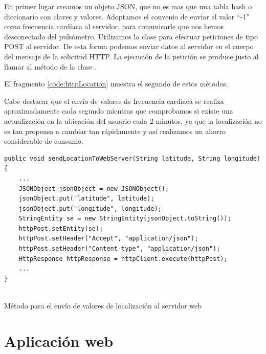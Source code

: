En primer lugar creamos un objeto \ac{JSON}, que no es mas que una tabla hash o diccionario con claves y valores. Adoptamos el convenio de enviar el valor ``-1'' como frecuencia cardíaca al servidor, para comunicarle que nos hemos desconectado del pulsómetro. Utilizamos la clase  para efectuar peticiones de tipo POST al servidor. De esta forma podemos enviar datos al servidor en el cuerpo del mensaje de la solicitud HTTP. La ejecución de la petición se produce justo al llamar al método  de la clase .

El fragmento \ref{code:httpLocation} muestra el segundo de estos métodos.

Cabe destacar que el envío de valores de frecuencia cardíaca se realiza aproximadamente cada segundo mientras que comprobamos si existe una actualización en la ubicación del usuario cada 2 minutos, ya que la localización no es tan propensa a cambiar tan rápidamente y así realizamos un ahorro considerable de consumo.

\begin{listing}[h] 
\begin{verbatim}
public void sendLocationToWebServer(String latitude, String longitude) {
	...
    JSONObject jsonObject = new JSONObject();
    jsonObject.put("latitude", latitude);
    jsonObject.put("longitude", longitude);
    StringEntity se = new StringEntity(jsonObject.toString());
    httpPost.setEntity(se);
    httpPost.setHeader("Accept", "application/json");
    httpPost.setHeader("Content-type", "application/json");
    HttpResponse httpResponse = httpClient.execute(httpPost);
    ...
}
	
\end{verbatim}
\caption{Método para el envío de valores de localización al servidor web}
\label{code:httpLocation}
\end{listing}


\section{Aplicación web} 

